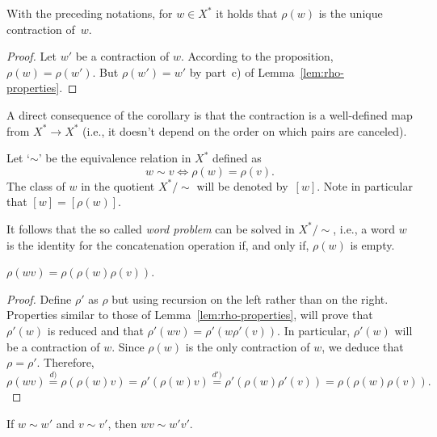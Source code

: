 \begin{cor}\label{cor:unique-reduced-word}
    With the preceding notations, for\/ $w\in X^*$ it holds that\/ $\rho(w)$ is the unique contraction of\/~$w$.
\end{cor}

\begin{proof}
    Let $w'$ be a contraction of $w$. According to the proposition, $\rho(w)=\rho(w')$. But $\rho(w')=w'$ by part~c) of Lemma~\ref{lem:rho-properties}.
\end{proof}

\begin{rem}
    A direct consequence of the corollary is that the contraction is a well-defined map from $X^*\to X^*$ (i.e., it doesn't depend on the order on which pairs are canceled).
\end{rem}

\begin{defn}\label{defn:similar-words}
    Let `$\sim$' be the equivalence relation in\/ $X^*$ defined as
    $$
        w\sim v \iff \rho(w)=\rho(v).
    $$
    The class of\/ $w$ in the quotient\/ $X^*/{\sim}$ will be denoted by\/~$[w]$. Note in particular that $[w]=[\rho(w)]$.
\end{defn}

\begin{rem}\label{rem:word-problem}
    It follows that the so called \textsl{word problem} can be solved in $X^*/{\sim}$, i.e., a word $w$ is the identity for the concatenation operation if, and only if, $\rho(w)$ is empty.
\end{rem}

\begin{prop}
    $\rho(wv)=\rho(\rho(w)\rho(v))$.
\end{prop}

\begin{proof}
    Define $\rho'$ as $\rho$ but using recursion on the left rather than on the right. Properties similar to those of Lemma~\ref{lem:rho-properties}, will prove that $\rho'(w)$ is reduced and that $\rho'(wv)=\rho'(w\rho'(v))$. In particular, $\rho'(w)$ will be a contraction of $w$. Since $\rho(w)$ is the only contraction of $w$, we deduce that $\rho=\rho'$. Therefore,
    $$
        \rho(wv) \stackrel{d)}= \rho(\rho(w)v)=\rho'(\rho(w)v)
            \stackrel{d')}= \rho'(\rho(w)\rho'(v)) = \rho(\rho(w)\rho(v)).
    $$
\end{proof}

\begin{cor}\label{cor:word-product}
    If\/ $w\sim w'$ and\/ $v\sim v'$, then\/ $wv\sim w'v'$.
\end{cor}

